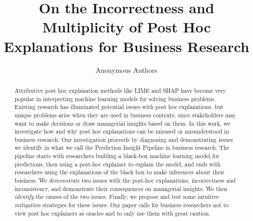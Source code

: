 \documentclass[11pt]{article}    %
\date{}
\begin{document}
\title{On the Incorrectness and Multiplicity of Post Hoc Explanations for Business Research}

\author{Anonymous Authors}






\maketitle

\begin{abstract}
    Attributive post hoc explanation methods like LIME and SHAP have become very popular in interpreting machine learning models for solving business problems. Existing research has illuminated potential issues with post hoc explanations, but unique problems arise when they are used in business contexts, since stakeholders may want to make decisions or draw managerial insights based on them. %
    In this work, we investigate how and why post hoc explanations can be misused or misunderstood in business research. Our investigation proceeds by diagnosing and demonstrating issues we identify in what we call the Prediction Insight Pipeline in business research. The pipeline starts with researchers building a black-box machine learning model for predictions, then using a post-hoc explainer to explain the model, and ends with researchers using the explanations of the black box to make inferences about their business. We \textit{demonstrate} two issues with the post-hoc explanations, incorrectness and inconsistency,  and demonstrate their consequences on managerial insights. We then \textit{identify} the causes of the two issues. Finally, we propose and test some intuitive \textit{mitigation} strategies for these issues. 
    Our paper calls for business researchers not to view post hoc explainers as oracles and to only use them with great caution.
\end{abstract}%
%
\end{document}
